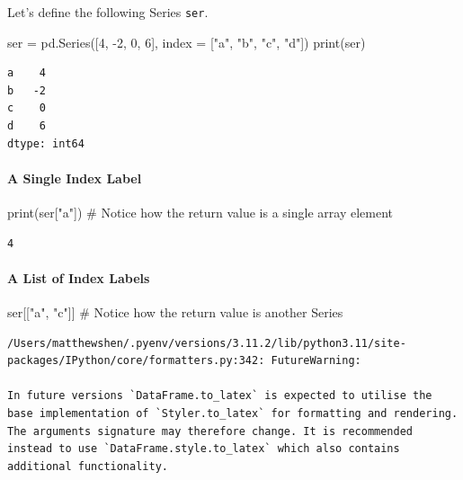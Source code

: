 \documentclass[
  letterpaper,
  DIV=11,
  numbers=noendperiod]{scrreprt}
\let\oldparagraph\paragraph
\renewcommand{\paragraph}[1]{\oldparagraph{#1}\mbox{}}
\newenvironment{Shaded}{\begin{snugshade}}{\end{snugshade}}
\newcommand{\BuiltInTok}[1]{\textcolor[rgb]{0.00,0.23,0.31}{#1}}
\newcommand{\CommentTok}[1]{\textcolor[rgb]{0.37,0.37,0.37}{#1}}
\newcommand{\DecValTok}[1]{\textcolor[rgb]{0.68,0.00,0.00}{#1}}
\newcommand{\NormalTok}[1]{\textcolor[rgb]{0.00,0.23,0.31}{#1}}
\newcommand{\OperatorTok}[1]{\textcolor[rgb]{0.37,0.37,0.37}{#1}}
\newcommand{\StringTok}[1]{\textcolor[rgb]{0.13,0.47,0.30}{#1}}
\begin{document}
Let's define the following Series \texttt{ser}.

\begin{Shaded}
\begin{Highlighting}[]
\NormalTok{ser }\OperatorTok{=}\NormalTok{ pd.Series([}\DecValTok{4}\NormalTok{, }\OperatorTok{{-}}\DecValTok{2}\NormalTok{, }\DecValTok{0}\NormalTok{, }\DecValTok{6}\NormalTok{], index }\OperatorTok{=}\NormalTok{ [}\StringTok{"a"}\NormalTok{, }\StringTok{"b"}\NormalTok{, }\StringTok{"c"}\NormalTok{, }\StringTok{"d"}\NormalTok{])}
\BuiltInTok{print}\NormalTok{(ser)}
\end{Highlighting}
\end{Shaded}

\begin{verbatim}
a    4
b   -2
c    0
d    6
dtype: int64
\end{verbatim}

\hypertarget{a-single-index-label}{%
\paragraph{A Single Index Label}\label{a-single-index-label}}

\begin{Shaded}
\begin{Highlighting}[]
\BuiltInTok{print}\NormalTok{(ser[}\StringTok{"a"}\NormalTok{]) }\CommentTok{\# Notice how the return value is a single array element}
\end{Highlighting}
\end{Shaded}

\begin{verbatim}
4
\end{verbatim}

\hypertarget{a-list-of-index-labels}{%
\paragraph{A List of Index Labels}\label{a-list-of-index-labels}}

\begin{Shaded}
\begin{Highlighting}[]
\NormalTok{ser[[}\StringTok{"a"}\NormalTok{, }\StringTok{"c"}\NormalTok{]] }\CommentTok{\# Notice how the return value is another Series}
\end{Highlighting}
\end{Shaded}

\begin{verbatim}
/Users/matthewshen/.pyenv/versions/3.11.2/lib/python3.11/site-packages/IPython/core/formatters.py:342: FutureWarning:

In future versions `DataFrame.to_latex` is expected to utilise the base implementation of `Styler.to_latex` for formatting and rendering. The arguments signature may therefore change. It is recommended instead to use `DataFrame.style.to_latex` which also contains additional functionality.
\end{verbatim}
\end{document}

